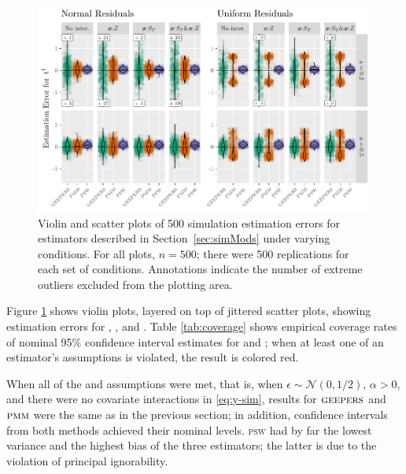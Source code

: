 \documentclass[]{article}
\begin{document}
\begin{figure}[!ht]
  \centering
  \includegraphics[width=5.5in,clip]{../simFigs/boxplotsNew.pdf}
  \caption{Violin and scatter plots of 500 simulation estimation errors for estimators described in Section~\ref{sec:simMods} under varying conditions. For all plots, $n=500$; there were 500 replications for each set of conditions. Annotations indicate the number of extreme outliers excluded from the plotting area.}
  \label{fig:boxplots}
\end{figure}

Figure \ref{fig:boxplots} shows violin plots, layered on top of jittered scatter plots, showing estimation errors for \geepers, \pmm, and \psw. Table \ref{tab:coverage} shows empirical coverage rates of nominal 95\% confidence interval estimates for \geepers and \pmm; when at least one of an estimator's assumptions is violated, the result is colored red.

When all of the \geepers and \pmm assumptions were met, that is, when $\epsilon\sim\mathcal{N}(0,1/2)$, $\alpha>0$, and there were no covariate interactions in \eqref{eq:y-sim}, results for $\textsc{geepers}$ and $\textsc{pmm}$ were the same as in the previous section; in addition, confidence intervals from both methods achieved their nominal levels. 
\textsc{psw} had by far the lowest variance and the highest bias of the three estimators; the latter is due to the violation of principal ignorability. 

\end{document}
